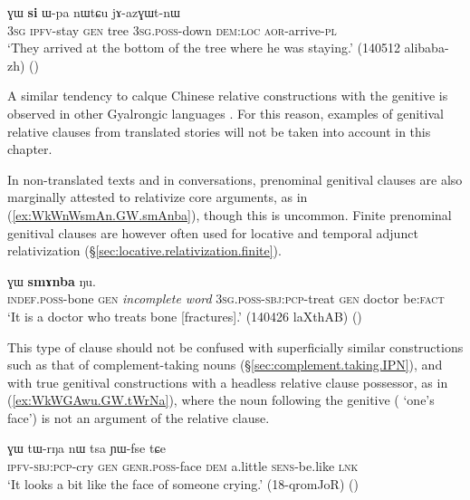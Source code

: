 \begin{exe}
\ex \label{ex:kurAZi.GW.relative}
  ɣɯ \textbf{si} ɯ-pa nɯtɕu jɤ-azɣɯt-nɯ \\
 \textsc{3sg} \textsc{ipfv}-stay \textsc{gen} tree \textsc{3sg}.\textsc{poss}-down \textsc{dem}:\textsc{loc} \textsc{aor}-arrive-\textsc{pl} \\
\glt `They arrived at the bottom of the tree where he was staying.' (140512 alibaba-zh)
()
\end{exe}
 
A similar tendency to calque Chinese relative constructions with the genitive is observed in other Gyalrongic languages \citep{lai18genitivization}.  For this reason, examples of genitival relative clauses from translated stories will not be taken into account in this chapter. 

In non-translated texts and in conversations, prenominal genitival clauses are also marginally attested to relativize core arguments, as in (\ref{ex:WkWnWsmAn.GW.smAnba}), though this is uncommon. Finite prenominal genitival clauses are however often used for locative and temporal adjunct relativization (§\ref{sec:locative.relativization.finite}).

\begin{exe}
\ex \label{ex:WkWnWsmAn.GW.smAnba}
  ɣɯ \textbf{smɤnba} ŋu. \\
 \textsc{indef}.\textsc{poss}-bone \textsc{gen} \textit{incomplete word} \textsc{3sg}.\textsc{poss}-\textsc{sbj}:\textsc{pcp}-treat \textsc{gen} doctor be:\textsc{fact} \\
 \glt `It is a doctor who treats bone [fractures].'  (140426 laXthAB)
 ()
 \end{exe}
  
This type of clause should not be confused with superficially similar constructions such as that of com\-ple\-ment-taking nouns (§\ref{sec:complement.taking.IPN}), and with true genitival constructions with a headless relative clause possessor, as in (\ref{ex:WkWGAwu.GW.tWrNa}), where the noun following the genitive ( `one's face') is not an argument of the relative clause.
 
\begin{exe}
\ex \label{ex:WkWGAwu.GW.tWrNa}
\gll [ɲɯ-kɯ-ɣɤwu] ɣɯ tɯ-rŋa nɯ tsa ɲɯ-fse tɕe \\
 \textsc{ipfv}-\textsc{sbj}:\textsc{pcp}-cry \textsc{gen} \textsc{genr}.\textsc{poss}-face \textsc{dem} a.little \textsc{sens}-be.like \textsc{lnk} \\
 \glt `It looks a bit like the face of someone crying.' (18-qromJoR)
()
\end{exe}
  
